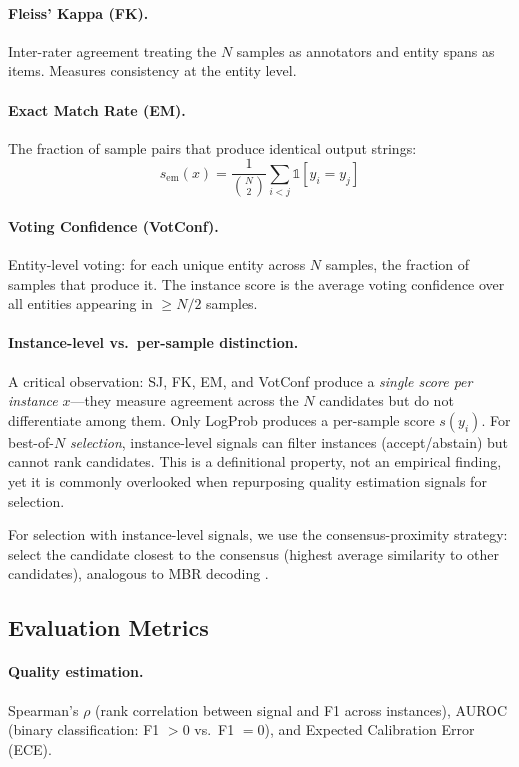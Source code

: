 \documentclass[11pt,a4paper]{article}
\begin{document}
\paragraph{Fleiss' Kappa (FK).}
Inter-rater agreement treating the $N$ samples as annotators and entity spans as items. Measures consistency at the entity level.

\paragraph{Exact Match Rate (EM).}
The fraction of sample pairs that produce identical output strings:
\begin{equation}
s_{\text{em}}(x) = \frac{1}{\binom{N}{2}} \sum_{i < j} \mathbb{1}[y_i = y_j]
\end{equation}

\paragraph{Voting Confidence (VotConf).}
Entity-level voting: for each unique entity across $N$ samples, the fraction of samples that produce it. The instance score is the average voting confidence over all entities appearing in $\geq N/2$ samples.

\paragraph{Instance-level vs.\ per-sample distinction.}
A critical observation: SJ, FK, EM, and VotConf produce a \emph{single score per instance} $x$---they measure agreement across the $N$ candidates but do not differentiate among them. Only LogProb produces a per-sample score $s(y_i)$. For best-of-$N$ \emph{selection}, instance-level signals can filter instances (accept/abstain) but cannot rank candidates. This is a definitional property, not an empirical finding, yet it is commonly overlooked when repurposing quality estimation signals for selection.

For selection with instance-level signals, we use the consensus-proximity strategy: select the candidate closest to the consensus (highest average similarity to other candidates), analogous to MBR decoding \citep{eikema2022sampling}.

\subsection{Evaluation Metrics}
\label{sec:metrics}

\paragraph{Quality estimation.} Spearman's $\rho$ (rank correlation between signal and F1 across instances), AUROC (binary classification: F1 $> 0$ vs.\ F1 $= 0$), and Expected Calibration Error (ECE).
\end{document}
